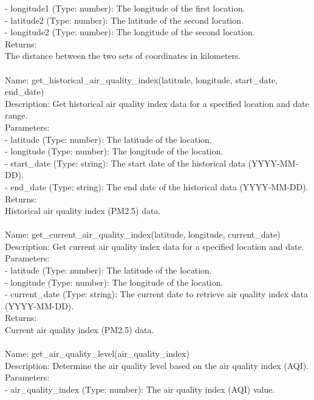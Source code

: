 \begin{tcolorbox}[breakable,title=Prompt Details for Weather]
- longitude1 (Type: number): The longitude of the first location.\\
- latitude2 (Type: number): The latitude of the second location.\\
- longitude2 (Type: number): The longitude of the second location.\\
Returns:\\
The distance between the two sets of coordinates in kilometers.\\
\\
Name: get\_historical\_air\_quality\_index(latitude, longitude, start\_date, end\_date)\\
Description: Get historical air quality index data for a specified location and date range.\\
Parameters:\\
- latitude (Type: number): The latitude of the location.\\
- longitude (Type: number): The longitude of the location.\\
- start\_date (Type: string): The start date of the historical data (YYYY-MM-DD).\\
- end\_date (Type: string): The end date of the historical data (YYYY-MM-DD).\\
Returns:\\
Historical air quality index (PM2.5) data.\\
\\
Name: get\_current\_air\_quality\_index(latitude, longitude, current\_date)\\
Description: Get current air quality index data for a specified location and date.\\
Parameters:\\
- latitude (Type: number): The latitude of the location.\\
- longitude (Type: number): The longitude of the location.\\
- current\_date (Type: string): The current date to retrieve air quality index data (YYYY-MM-DD).\\
Returns:\\
Current air quality index (PM2.5) data.\\
\\
Name: get\_air\_quality\_level(air\_quality\_index)\\
Description: Determine the air quality level based on the air quality index (AQI).\\
Parameters:\\
- air\_quality\_index (Type: number): The air quality index (AQI) value.\\

\end{tcolorbox}

